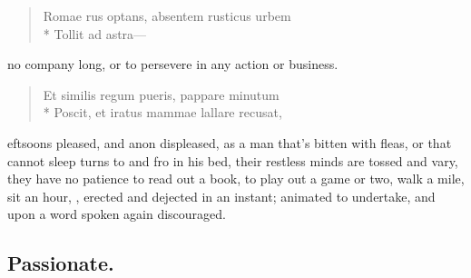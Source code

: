 {\begin{latin}
\begin{verse}%
Romae rus optans, absentem rusticus urbem\\*
Tollit ad astra---
\end{verse}%
\end{latin}

no company long, or to persevere in any action or business.

\begin{latin}
\begin{verse}%
Et similis regum pueris, pappare minutum\\*
Poscit, et iratus mammae lallare recusat,
\end{verse}%
\end{latin}

eftsoons pleased, and anon displeased, as a man that's bitten with fleas, or
that cannot sleep turns to and fro in his bed, their restless minds are tossed
and vary, they have no patience to read out a book, to play out a game or two,
walk a mile, sit an hour, \etc{}, erected and dejected in an instant; animated
to undertake, and upon a word spoken again discouraged.

\subsection{Passionate.}

}
